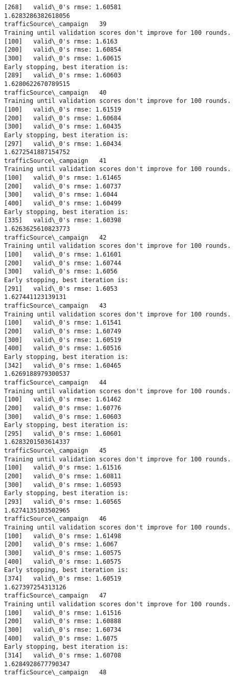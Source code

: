 \documentclass[11pt]{article}
\begin{document}
\begin{Verbatim}[commandchars=\\\{\}]
[268]	valid\_0's rmse: 1.60581
1.6283286382618056
trafficSource\_campaign   39
Training until validation scores don't improve for 100 rounds.
[100]	valid\_0's rmse: 1.6163
[200]	valid\_0's rmse: 1.60854
[300]	valid\_0's rmse: 1.60615
Early stopping, best iteration is:
[289]	valid\_0's rmse: 1.60603
1.6280622670789515
trafficSource\_campaign   40
Training until validation scores don't improve for 100 rounds.
[100]	valid\_0's rmse: 1.61519
[200]	valid\_0's rmse: 1.60684
[300]	valid\_0's rmse: 1.60435
Early stopping, best iteration is:
[297]	valid\_0's rmse: 1.60434
1.6272541887154752
trafficSource\_campaign   41
Training until validation scores don't improve for 100 rounds.
[100]	valid\_0's rmse: 1.61465
[200]	valid\_0's rmse: 1.60737
[300]	valid\_0's rmse: 1.6044
[400]	valid\_0's rmse: 1.60499
Early stopping, best iteration is:
[335]	valid\_0's rmse: 1.60398
1.6263625610823773
trafficSource\_campaign   42
Training until validation scores don't improve for 100 rounds.
[100]	valid\_0's rmse: 1.61601
[200]	valid\_0's rmse: 1.60744
[300]	valid\_0's rmse: 1.6056
Early stopping, best iteration is:
[291]	valid\_0's rmse: 1.6053
1.627441123139131
trafficSource\_campaign   43
Training until validation scores don't improve for 100 rounds.
[100]	valid\_0's rmse: 1.61541
[200]	valid\_0's rmse: 1.60749
[300]	valid\_0's rmse: 1.60519
[400]	valid\_0's rmse: 1.60516
Early stopping, best iteration is:
[342]	valid\_0's rmse: 1.60465
1.6269188979300537
trafficSource\_campaign   44
Training until validation scores don't improve for 100 rounds.
[100]	valid\_0's rmse: 1.61462
[200]	valid\_0's rmse: 1.60776
[300]	valid\_0's rmse: 1.60603
Early stopping, best iteration is:
[295]	valid\_0's rmse: 1.60601
1.6283201503614337
trafficSource\_campaign   45
Training until validation scores don't improve for 100 rounds.
[100]	valid\_0's rmse: 1.61516
[200]	valid\_0's rmse: 1.60811
[300]	valid\_0's rmse: 1.60593
Early stopping, best iteration is:
[293]	valid\_0's rmse: 1.60565
1.6274135103502965
trafficSource\_campaign   46
Training until validation scores don't improve for 100 rounds.
[100]	valid\_0's rmse: 1.61498
[200]	valid\_0's rmse: 1.6067
[300]	valid\_0's rmse: 1.60575
[400]	valid\_0's rmse: 1.60575
Early stopping, best iteration is:
[374]	valid\_0's rmse: 1.60519
1.627397254313126
trafficSource\_campaign   47
Training until validation scores don't improve for 100 rounds.
[100]	valid\_0's rmse: 1.61516
[200]	valid\_0's rmse: 1.60888
[300]	valid\_0's rmse: 1.60734
[400]	valid\_0's rmse: 1.6075
Early stopping, best iteration is:
[314]	valid\_0's rmse: 1.60708
1.6284928677790347
trafficSource\_campaign   48

\end{Verbatim}
\end{document}
